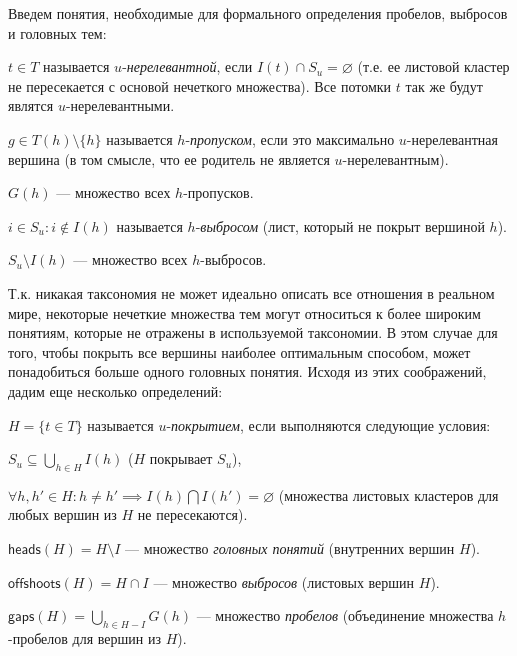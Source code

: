 \documentclass[12pt]{article}
\renewcommand{\emptyset}{\varnothing}
\newenvironment{itemize*}%
{\begin{itemize}%
	\setlength{\itemsep}{0pt}%
	\setlength{\parskip}{0pt}}%
{\end{itemize}}
\newenvironment{enumerate*}%
{\begin{enumerate}%
	\setlength{\itemsep}{0pt}%
	\setlength{\parskip}{0pt}}%
{\end{enumerate}}
\let\smallcap\cap
\renewcommand{\cup}{\bigcup}
\renewcommand{\cap}{\bigcap}
\begin{document}
Введем понятия, необходимые для формального определения пробелов, выбросов и головных тем: 
\begin{itemize*}
	\item $t\in T$ называется $u$-\textit{нерелевантной}, если $I(t) \smallcap S_u=\emptyset$ (т.е. ее листовой кластер не пересекается с основой нечеткого множества).
	Все потомки $t$ так же будут являтся $u$-нерелевантными.
	\item $g\in T(h)\setminus\{h\}$ называется $h$-\textit{пропуском}, если это максимально $u$-нерелевантная вершина (в том смысле, что ее родитель не является $u$-нерелевантным). 
	\item $G(h)$ --- множество всех $h$-пропусков.
	\item $i\in S_u: i\notin I(h)$ называется $h$-\textit{выбросом} (лист, который не покрыт вершиной $h$).
	\item $S_u \setminus I(h)$ --- множество всех $h$-выбросов.
\end{itemize*}

Т.к. никакая таксономия не может идеально описать все отношения в реальном мире, некоторые нечеткие множества тем могут относиться к более широким понятиям, которые не отражены в используемой таксономии. В этом случае для того, чтобы покрыть все вершины наиболее оптимальным способом, может понадобиться больше одного головных понятия. Исходя из этих соображений, дадим еще несколько определений:

\begin{itemize*}
	\item $H=\{t\in T\}$ называется $u$-\textit{покрытием}, если выполняются следующие условия:
	\begin{enumerate*}
		\item $S_u\subseteq \cup_{h\in H}I(h)$ ($H$ покрывает $S_u$),
		\item $\forall h, h' \in H: h\neq h' \implies I(h)\cap I(h') = \emptyset$ (множества листовых кластеров для любых вершин из $H$ не пересекаются).
	\end{enumerate*}
	\item $\textsf{heads}(H)=H\setminus I$ --- множество \textit{головных понятий} (внутренних вершин $H$).
	\item $\textsf{offshoots}(H) = H\smallcap I$ --- множество \textit{выбросов} (листовых вершин $H$).
	\item $\textsf{gaps}(H) = \cup_{h\in H-I}G(h) $  --- множество \textit{пробелов} (объединение множества $h$-пробелов для вершин из $H$).
\end{itemize*}
\end{document}
